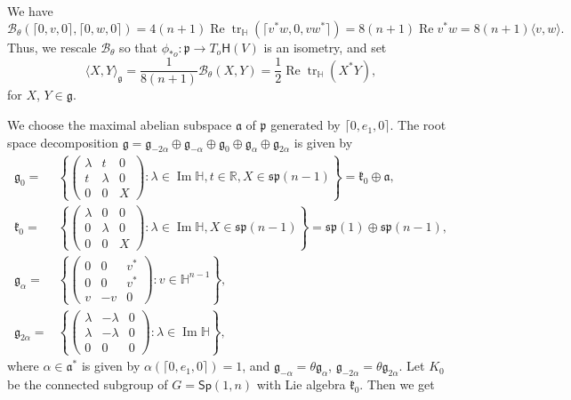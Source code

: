 \documentclass[12pt, a4paper]{amsart}
\newcommand{\g}{\mathfrak}
\newcommand{\tr}{\operatorname{tr}}
\newcommand{\R}{\mathbb{R}}
\renewcommand{\H}{\mathbb{H}}
\renewcommand{\Re}{\operatorname{Re}}
\renewcommand{\Im}{\operatorname{Im}}
\newcommand{\Sp}{\mathsf{Sp}}
\theoremstyle{remark}
\begin{document}
We have 
\[
\mathcal{B}_\theta(\lceil 0,v,0\rceil,\lceil 0,w,0\rceil)
=4(n+1)\Re\tr_\H(\lceil v^*w,0,vw^*\rceil)
=8(n+1)\Re v^*w
=8(n+1)\langle v,w\rangle.
\]
Thus, we rescale $\mathcal{B}_\theta$ so that $\phi_{*o}\colon\g{p}\to T_o\mathsf{H}(V)$ is an isometry, and set
\[
\langle X,Y\rangle_{\g{g}}
=\frac{1}{8(n+1)}\mathcal{B}_\theta(X,Y)
=\frac{1}{2}\Re\tr_\H(X^*Y),
\]
for $X$, $Y\in\g{g}$.

We choose the maximal abelian subspace $\g{a}$ of $\g{p}$ generated by $\lceil 0,e_{1},0\rceil$.
The root space decomposition $\g{g}=\g{g}_{-2\alpha}\oplus\g{g}_{-\alpha}\oplus\g{g}_{0}\oplus\g{g}_{\alpha}\oplus\g{g}_{2\alpha}$ is given by
\[
\begin{aligned}
\g{g}_{0}={}&\left\{
	\left(
		\begin{array}{cc|c}
			\lambda & t & 0 \\
			t & \lambda & 0 \\
			\hline
			0 & 0 & X
		\end{array}
	\right)\colon \lambda\in\Im\H,t\in\R,X\in\g{sp}(n-1)
\right\}=\g{k}_{0}\oplus \g{a}, \\
\g{k}_{0}={}&\left\{
\left(
\begin{array}{cc|c}
	\lambda & 0 & 0 \\
	0 & \lambda & 0 \\
	\hline
	0 & 0 & X
\end{array}
\right)\colon \lambda\in\Im\H,X\in\g{sp}(n-1)
\right\}=\g{sp}(1)\oplus \g{sp}(n-1), \\
\g{g}_{\alpha}={}&\left\{
	\left(
		\begin{array}{cc|c}
			0 & 0 & v^{*} \\
			0 & 0 & v^{*} \\
			\hline
			v & -v & 0
		\end{array}
	\right)\colon v\in \H^{n-1}
\right\}, \\
\g{g}_{2\alpha}={}&\left\{
	\left(
		\begin{array}{cc|c}
			\lambda & -\lambda & 0 \\
			\lambda & -\lambda & 0 \\
			\hline
			0 & 0 & 0
		\end{array}
	\right)\colon \lambda\in \Im \H
\right\},
\end{aligned}
\]
where $\alpha\in\g{a}^*$ is given by $\alpha(\lceil 0,e_1,0\rceil)=1$, 
and $\g{g}_{-\alpha}=\theta\g{g}_\alpha$, $\g{g}_{-2\alpha}=\theta\g{g}_{2\alpha}$.
Let ${K}_{0}$ be the connected subgroup of ${G}=\Sp(1,n)$ with Lie algebra $\g{k}_{0}$.
Then we get
\end{document}
